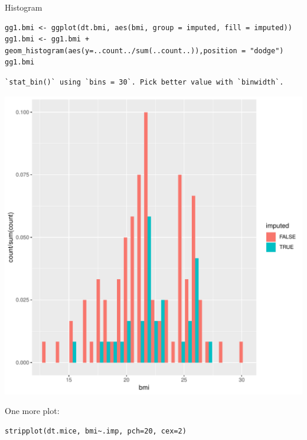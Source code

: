 \documentclass[12pt]{article}
\begin{document}
Histogram
\lstset{language=r,label= ,caption= ,captionpos=b,numbers=none}
\begin{lstlisting}
gg1.bmi <- ggplot(dt.bmi, aes(bmi, group = imputed, fill = imputed))
gg1.bmi <- gg1.bmi + geom_histogram(aes(y=..count../sum(..count..)),position = "dodge")
gg1.bmi
\end{lstlisting}

\begin{verbatim}
`stat_bin()` using `bins = 30`. Pick better value with `binwidth`.
\end{verbatim}

\begin{center}
\includegraphics[width=.9\linewidth]{./histImputed.pdf}
\end{center}

One more plot:

\lstset{language=r,label= ,caption= ,captionpos=b,numbers=none}
\begin{lstlisting}
stripplot(dt.mice, bmi~.imp, pch=20, cex=2)
\end{lstlisting}
\end{document}
